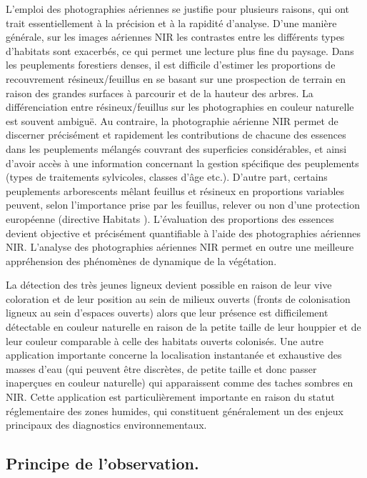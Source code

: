 \documentclass[a4paper,11pt]{report}
\begin{document}
L'emploi des photographies aériennes se justifie pour plusieurs raisons, qui ont trait essentiellement à la précision et à la rapidité d'analyse. 
D'une manière générale, sur les images aériennes NIR les contrastes entre les différents types d'habitats sont exacerbés, ce qui permet une lecture plus fine du paysage. 
Dans les peuplements forestiers denses, il est difficile d'estimer les proportions de recouvrement résineux/feuillus en se basant sur une prospection de terrain en raison des grandes surfaces à parcourir et de la hauteur des arbres. 
La différenciation entre résineux/feuillus sur les photographies en couleur naturelle est souvent ambiguë. 
Au contraire, la photographie aérienne NIR permet de discerner précisément et rapidement les contributions de chacune des essences dans les peuplements mélangés couvrant des superficies considérables, et ainsi d'avoir accès à une information concernant la gestion spécifique des peuplements (types de traitements sylvicoles, classes d'âge etc.).  D'autre part, certains peuplements arborescents mêlant feuillus et résineux en proportions variables peuvent, selon l'importance prise par les feuillus, relever ou non d'une protection européenne (directive \og Habitats \fg). 
L'évaluation des proportions des essences devient objective et précisément quantifiable à l'aide des photographies aériennes NIR. 
L'analyse des photographies aériennes NIR permet en outre une meilleure appréhension des phénomènes de dynamique de la végétation.
 
La détection des très jeunes ligneux devient possible en raison de leur vive coloration et de leur position au sein de milieux ouverts (fronts de colonisation ligneux au sein d'espaces ouverts) alors que leur présence est difficilement détectable en couleur naturelle en raison de la petite taille de leur houppier et de leur couleur comparable à celle des habitats ouverts colonisés. 
Une autre application importante concerne la localisation instantanée et exhaustive des masses d'eau (qui peuvent être discrètes, de petite taille et donc passer inaperçues en couleur naturelle) qui apparaissent comme des taches sombres  en NIR. 
Cette application est particulièrement importante en raison du statut réglementaire des zones humides, qui constituent généralement un des enjeux principaux des diagnostics environnementaux. 


\subsection{Principe de l'observation.}
\end{document}
